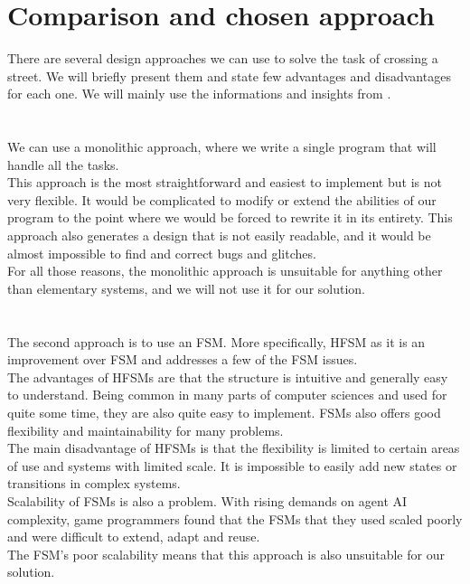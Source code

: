 \section{Comparison and chosen approach}
    There are several design approaches we can use to solve the task of crossing a street. We will briefly present them and state few advantages and disadvantages for each one. We will mainly use the informations and insights from \cite{BT_intro}.\\\\
    \\
        We can use a monolithic approach, where we write a single program that will handle all the tasks.\\
        This approach is the most straightforward and easiest to implement but is not very flexible. It would be complicated to modify or extend the abilities of our program to the point where we would be forced to rewrite it in its entirety. This approach also generates a design that is not easily readable, and it would be almost impossible to find and correct bugs and glitches.\\
        For all those reasons, the monolithic approach is unsuitable for anything other than elementary systems, and we will not use it for our solution.\\\\
    \\
        The second approach is to use an FSM. More specifically, HFSM as it is an improvement over FSM and addresses a few of the FSM issues.\\
        The advantages of HFSMs are that the structure is intuitive and generally easy to understand. Being common in many parts of computer sciences and used for quite some time, they are also quite easy to implement. FSMs also offers good flexibility and maintainability for many problems.\\
        The main disadvantage of HFSMs is that the flexibility is limited to certain areas of use and systems with limited scale. It is impossible to easily add new states or transitions in complex systems.\\
        Scalability of FSMs is also a problem. With rising demands on agent AI complexity, game programmers found that the FSMs that they used scaled poorly and were difficult to extend, adapt and reuse.\cite{BT_survey}\\
        The FSM's poor scalability means that this approach is also unsuitable for our solution.\\\\
